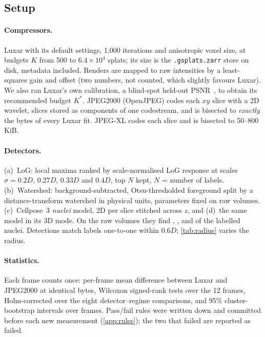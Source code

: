 \documentclass[
  paper=a4,
  fontsize=11pt,
  english,
  numbers=noenddot,
  parskip=half,
  cdgeometry=symmetric,
  cd=barcolor,
  cdfont=false
]{tudscrartcl}
\begin{document}
\subsection{Setup}

\paragraph{Compressors.} Luxar with its default settings, 1{,}000 iterations and anisotropic
voxel size, at budgets $K$ from 500 to $6.4\times10^4$ splats; its size is the
\texttt{.gsplats.zarr} store on disk, metadata included. Renders are mapped to raw intensities
by a least-squares gain and offset (two numbers, not counted, which slightly favours Luxar). We
also ran Luxar's own calibration, a blind-spot held-out PSNR~\cite{batson2019noise2self}, to
obtain its recommended budget $K^\ast$. JPEG2000 (OpenJPEG) codes each $xy$ slice with a 2D
wavelet, slices stored as components of one codestream, and is bisected to \emph{exactly} the
bytes of every Luxar fit. JPEG-XL codes each slice and is bisected to 50--800\,KiB.

\paragraph{Detectors.} (a)~LoG: local maxima ranked by scale-normalised LoG response
at scales $\sigma = 0.2D$, $0.27D$, $0.33D$ and $0.4D$, top $N$ kept, $N$ = number of labels. (b)~Watershed:
background-subtracted, Otsu-thresholded foreground split by a distance-transform watershed in
physical units, parameters fixed on raw volumes. (c)~Cellpose~3 \emph{nuclei} model, 2D per
slice stitched across $z$, and (d)~the same model in its 3D mode. On the raw volumes they find
\RecallLoG, \RecallWS, \RecallCP{} and \RecallCPthree{} of the labelled nuclei. Detections match
labels one-to-one within $0.6D$; \cref{tab:radius} varies the radius.

\paragraph{Statistics.} Each frame counts once: per-frame mean difference between Luxar and
JPEG2000 at identical bytes, Wilcoxon signed-rank tests over the 12 frames, Holm-corrected over
the eight detector--regime comparisons, and 95\% cluster-bootstrap intervals over frames.
Pass/fail rules were written down and committed before each new measurement
(\cref{app:rules}); the two that failed are reported as failed.
\end{document}
